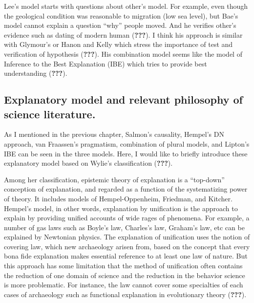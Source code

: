 \documentclass[american,man]{apa6}
\begin{document}
Lee's model starts with questions about other's model. For example, even
though the geological condition was reasonable to migration (low sea
level), but Bae's model cannot explain a question \enquote{why} people
moved. And he verifies other's evidence such as dating of modern human
({\textbf{???}}). I think his approach is similar with Glymour's or
Hanon and Kelly which stress the importance of test and verification of
hypothesis ({\textbf{???}}). His combination model seems like the model
of Inference to the Best Explanation (IBE) which tries to provide best
understanding ({\textbf{???}}).

\subsection{Explanatory model and relevant philosophy of science
literature.}\label{explanatory-model-and-relevant-philosophy-of-science-literature.}

As I mentioned in the previous chapter, Salmon's causality, Hempel's DN
approach, van Fraassen's pragmatism, combination of plural models, and
Lipton's IBE can be seen in the three models. Here, I would like to
briefly introduce these explanatory model based on Wylie's
classification ({\textbf{???}}).

Among her classification, epistemic theory of explanation is a
\enquote{top-down} conception of explanation, and regarded as a function
of the systematizing power of theory. It includes models of
Hempel-Oppenheim, Friedman, and Kitcher. Hempel's model, in other words,
explanation by unification is the approach to explain by providing
unified accounts of wide rages of phenomena. For example, a number of
gas laws such as Boyle's law, Charles's law, Graham's law, etc can be
explained by Newtonian physics. The explanation of unification uses the
notion of covering law, which new archaeology arisen from, based on the
concept that every bona fide explanation makes essential reference to at
least one law of nature. But this approach has some limitation that the
method of unification often contains the reduction of one domain of
science and the reduction in the behavior science is more problematic.
For instance, the law cannot cover some specialties of each cases of
archaeology such as functional explanation in evolutionary theory
({\textbf{???}}).
\end{document}
